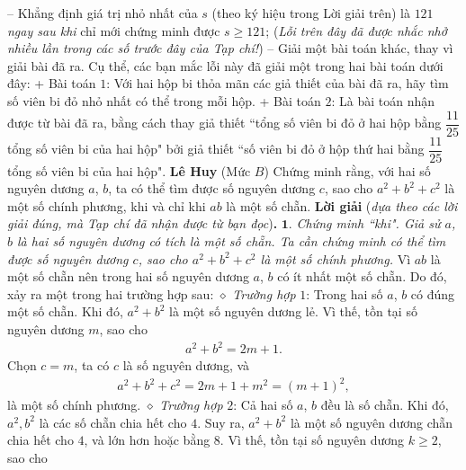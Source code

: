 \begin{multicols}{2}
	\vskip 0.05cm
	-- Khẳng định giá trị nhỏ nhất của $s$ (theo ký hiệu trong Lời giải trên) là $121$ \textit{ngay sau khi} chỉ mới chứng minh được $s \ge 121$;
	\vskip 0.05cm
	(\textit{Lỗi trên đây đã được nhắc nhở nhiều lần trong các số trước đây của Tạp chí!})
	\vskip 0.05cm
	-- Giải một bài toán khác, thay vì giải bài đã ra. Cụ thể, các bạn mắc lỗi này đã giải một trong hai bài toán dưới đây:
	\vskip 0.05cm
	+ Bài toán $1$: Với hai hộp bi thỏa mãn các giả thiết của bài đã ra, hãy tìm số viên bi đỏ nhỏ nhất có thể trong mỗi hộp.
	\vskip 0.05cm
	+ Bài toán $2$: Là bài toán nhận được từ bài đã ra, bằng cách thay giả thiết ``tổng số viên bi đỏ ở hai hộp bằng $\dfrac{11}{25}$ tổng số viên bi của hai hộp" bởi giả thiết ``số viên bi đỏ ở hộp thứ hai bằng $\dfrac{11}{25}$  tổng số viên bi của hai hộp".
	\vskip 0.1cm
		\hfill\textbf{\color{thachthuctoanhoc}Lê Huy}
	\vskip 0.1cm
	{}
	(Mức $B$) Chứng minh rằng, với hai số nguyên dương $a$, $b$, ta có thể tìm được số nguyên dương $c$, sao cho $a^2 + b^2 + c^2$  là một số chính phương, khi và chỉ khi $ab$ là một số chẵn.
	\vskip 0.05cm
	\textbf{\color{thachthuctoanhoc}Lời giải} (\textit{dựa theo các lời giải đúng, mà Tạp chí đã nhận được từ bạn đọc})\textbf{\color{thachthuctoanhoc}.}
	\vskip 0.05cm
	$\pmb{1.}$ \textit{Chứng minh ``khi".
	\vskip 0.05cm
	Giả sử $a$, $b$ là hai số nguyên dương có tích là một số chẵn. Ta cần chứng minh có thể tìm được số nguyên dương $c$, sao cho $a^2 + b^2 + c^2$  là một số chính phương.}
	\vskip 0.05cm
	Vì $ab$ là một số chẵn nên trong hai số nguyên dương $a$, $b$ có ít nhất một số chẵn. Do đó, xảy ra một trong hai trường hợp sau:
	\vskip 0.05cm
	$\diamond$ \textit{Trường hợp} $1$: Trong hai số $a$, $b$ có đúng một số chẵn.
	\vskip 0.05cm
	Khi đó, $a^2 + b^2$ là một số nguyên dương lẻ. Vì thế, tồn tại số nguyên dương $m$, sao cho
	\begin{align*}
		{a^2} + {b^2} = 2m + 1.
	\end{align*}
	Chọn $c = m$, ta có $c$ là số nguyên dương, và
	\begin{align*}
		{a^2} + {b^2} + {c^2} = 2m + 1 + {m^2} = {\left( {m + 1} \right)^2},
	\end{align*}
	là một số chính phương.
	\vskip 0.05cm
	$\diamond$ \textit{Trường hợp} $2$: Cả hai số $a$, $b$ đều là số chẵn.
	\vskip 0.05cm
	Khi đó, $a^2, b^2$  là các số chẵn chia hết cho $4$. Suy ra, $a^2 + b^2$ là một số nguyên dương chẵn chia hết cho $4$, và lớn hơn hoặc bằng $8$. Vì thế, tồn tại số nguyên dương $k \ge 2$, sao cho
	\begin{align*}

\end{align*}
\end{multicols}

